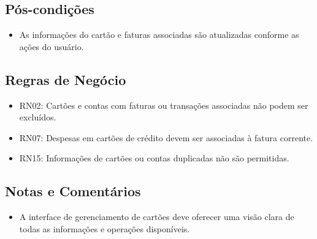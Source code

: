 \subsection*{Pós-condições}
\begin{addmargin}[1.5cm]{0cm}
	\begin{itemize}
		\item As informações do cartão e faturas associadas são atualizadas conforme as ações do usuário.
	\end{itemize}
\end{addmargin}

\subsection*{Regras de Negócio}
\begin{addmargin}[1.5cm]{0cm}
	\begin{itemize}
		\item RN02: Cartões e contas com faturas ou transações associadas não podem ser excluídos.
		\item RN07: Despesas em cartões de crédito devem ser associadas à fatura corrente.
		\item RN15: Informações de cartões ou contas duplicadas não são permitidas.
	\end{itemize}
\end{addmargin}

\subsection*{Notas e Comentários}
\begin{addmargin}[1.5cm]{0cm}
	\begin{itemize}
		\item A interface de gerenciamento de cartões deve oferecer uma visão clara de todas as informações e operações disponíveis.
	\end{itemize}
\end{addmargin}
